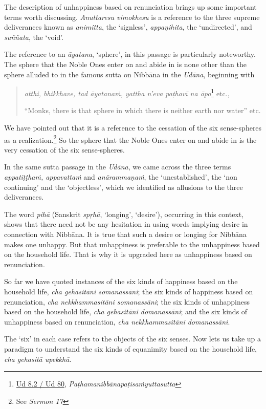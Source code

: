 The description of unhappiness based on renunciation brings up some important terms worth discussing. \emph{Anuttaresu vimokhesu} is a reference to the three supreme deliverances known as \emph{animitta}, the `signless', \emph{appaṇihita}, the `undirected', and \emph{suññata}, the `void'.

The reference to an \emph{āyatana}, `sphere', in this passage is particularly noteworthy. The sphere that the Noble Ones enter on and abide in is none other than the sphere alluded to in the famous sutta on Nibbāna in the \emph{Udāna}, beginning with

\begin{quote}
\emph{atthi, bhikkhave, tad āyatanaṁ, yattha n'eva paṭhavī na āpo}\footnote{\href{https://suttacentral.net/ud8.2/pli/ms}{Ud 8.2 / Ud 80}, \emph{Paṭhamanibbānapaṭisaṁyuttasutta}} etc.,

``Monks, there is that sphere in which there is neither earth nor water'' etc.
\end{quote}

We have pointed out that it is a reference to the cessation of the six sense-spheres as a realization.\footnote{See \emph{Sermon 17}} So the sphere that the Noble Ones enter on and abide in is the very cessation of the six sense-spheres.

In the same sutta passage in the \emph{Udāna}, we came across the three terms \emph{appatiṭṭhaṁ, appavattaṁ} and \emph{anārammaṇaṁ}, the `unestablished', the `non continuing' and the `objectless', which we identified as allusions to the three deliverances.

The word \emph{pihā} (Sanskrit \emph{spṛhā}, `longing', `desire'), occurring in this context, shows that there need not be any hesitation in using words implying desire in connection with Nibbāna. It is true that such a desire or longing for Nibbāna makes one unhappy. But that unhappiness is preferable to the unhappiness based on the household life. That is why it is upgraded here as unhappiness based on renunciation.

So far we have quoted instances of the six kinds of happiness based on the household life, \emph{cha gehasitāni somanassāni}; the six kinds of happiness based on renunciation, \emph{cha nekkhammasitāni somanassāni}; the six kinds of unhappiness based on the household life, \emph{cha gehasitāni domanassāni}; and the six kinds of unhappiness based on renunciation, \emph{cha nekkhammasitāni domanassāni}.

The `six' in each case refers to the objects of the six senses. Now lets us take up a paradigm to understand the six kinds of equanimity based on the household life, \emph{cha gehasitā upekkhā}.

